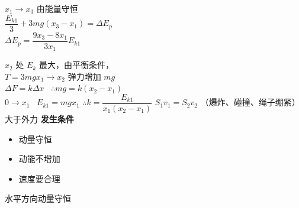 \unclear{$\because$} $x_1\to x_3$ 由能量守恒\\
$\dfrac{E_{k1}}{3}+3mg(x_3-x_1)=\Delta E_p$\\
$\Delta E_p=\dfrac{9x_3-8x_1}{3x_1}E_{k1}$

$x_2$ 处 $E_k$ 最大，由平衡条件，\\
\hspace*{1em}$T=3mg$\qquad $x_1\to x_2$ 弹力增加 $mg$\\
\hspace*{2em}$\Delta F=k\Delta x$ \ $\therefore mg=k(x_2-x_1)$\\
\hspace*{2em}$0\to x_1$ \ $E_{k1}=mgx_1$ \quad $\therefore k=\dfrac{E_{k1}}{x_1(x_2-x_1)}$
$S_1v_1=S_2v_2$
（爆炸、碰撞、绳子绷紧）大于外力
\textbf{发生条件}
\begin{itemize}
\item 动量守恒
\item 动能不增加
\item 速度要合理
\end{itemize}
水平方向动量守恒


